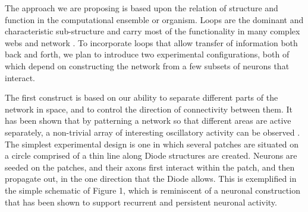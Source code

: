 The approach we are proposing is based upon the relation of structure and function in the computational ensemble or organism. Loops are the dominant and characteristic sub-structure and carry most of the functionality in many complex webs and network \cite{Eckmann2004}. To incorporate loops that allow transfer of information both back and forth, we plan to introduce two experimental configurations, both of which depend on constructing the network from a few subsets of neurons that interact.

The first construct is based on our ability to separate different parts of the network in space, and to control the direction of connectivity between them.  It has been shown that by patterning a network so that different areas are active separately, a non-trivial array of interesting oscillatory activity can be observed \cite{SheinIdelson2010}. The simplest experimental design is one in which several patches are situated on a circle comprised of a thin line along Diode structures are created. Neurons are seeded on the patches, and their axons first interact within the patch, and then propagate out, in the one direction that the Diode allows. This is exemplified in the simple schematic of Figure 1, which is reminiscent of a neuronal construction \cite{Vishwanathan2011} that has been shown to support recurrent and persistent neuronal activity.

